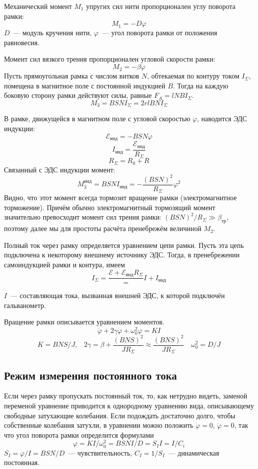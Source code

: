 Механический момент $M_{1}$ упругих сил нити пропорционален углу поворота рамки:
\[
    M_{1} = -D \varphi
\]
$D$~--- модуль кручения нити, $ \varphi$~--- угол поворота рамки от положения равновесия.

Момент сил вязкого трения пропорционален угловой скорости рамки:
\[
    M_{2} = - \beta \dot{ \varphi}
\]
Пусть прямоугольная рамка с числом витков $N$,  обтекаемая по контуру током $I_{ \Sigma}$,
помещена в магнитное поле с постоянной индукцией $B$. Тогда на каждую боковую сторону
рамки действуют силы, равные $F_{A} = lNBI_{ \Sigma}$.
\[
    M_{3} = BSNI_{ \Sigma} = 2rlBNI_{ \Sigma}
\]

В рамке, движущейся в магнитном поле с угловой скоростью $\dot{ \varphi}$, наводится ЭДС индукции:
\[
    \mathcal{E}_{\text{инд}} = -BSN\dot{\varphi}
\]
\[
    I_{\text{инд}} = \frac{\mathcal{E}_{\text{инд}}}{R_{ \Sigma}}
\]
\[
    R_{ \Sigma} = R_{0} + R
\]
Связанный с ЭДС индукции момент:
\[
   M_{3}^{\text{инд}} = BSNI_{\text{инд}} = -\frac{(BSN)^{2}}{R_{ \Sigma}}\varphi^{2}       
\]
Видно, что этот момент всегда тормозит вращение рамки (электромагнитное торможение).
Причём обычно электромагнитный тормозящий момент значительно превосходит момент сил трения рамки:
$(BSN)^{2}/R_{ \Sigma}\gg \beta_{\text{тр}}$,  поэтому далее мы для простоты расчёта пренебрежём величиной $M_{2}$.

Полный ток через рамку определяется уравнением цепи рамки.
Пусть эта цепь подключена к некоторому внешнему источнику ЭДС.  Тогда, в пренебрежении самоиндукцией рамки и контура, имеем
\[
    I_{\Sigma} = \frac{\mathcal{E} + \mathcal{E}_{\text{инд}}{R_{\Sigma}}} = I + I_{\text{инд}}
\]

$I$~--- составляющая тока, вызванная внешней ЭДС, к которой подключён гальванометр.

Вращение рамки описывается уравнением моментов.
\[
    \ddot{\varphi} + 2\gamma\dot{\varphi} + \omega_{0}^{2} \varphi = KI
\]
\[
    K = BNS/J,\;\;\;2\gamma = \beta + \frac{(BNS)^{2}}{JR_{\Sigma}}\approx\frac{(BNS)^{2}}{JR_{\Sigma}}\,\;\;\;\omega_{0}^{2} = D/J
\]

\subsection{Режим измерения постоянного тока}
Если через рамку пропускать постоянный ток, то, как нетрудно видеть, заменой переменой
уравнение приводится к однородному уравнению вида, описывающему свободные
затухающие колебания. Если подождать достаточно долго, чтобы собственные колебания затухли, в уравнении можно положить $\dot{ \varphi} = 0$, $\ddot{\varphi} = 0$,  так что угол поворота рамки определится формулами
\[
    \varphi = KI/\omega_{0}^{2} = BSNI/D = S_{I}I = I/C_{i}
\]
$S_{I} = \varphi/I = BSN/D$~--- чувствительность, $C_{I} = 1/S_{I}$~--- динамическая постоянная.

